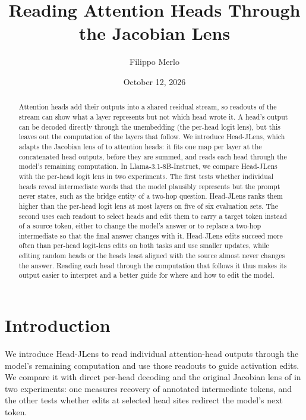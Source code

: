 \documentclass[11pt,a4paper]{article}
\title{Reading Attention Heads Through the Jacobian Lens}
\author{Filippo Merlo}
\date{October 12, 2026}
\begin{document}
\maketitle

\begin{abstract}
Attention heads add their outputs into a shared residual stream, so readouts of the stream can show what a layer represents but not which head wrote it. A head's output can be decoded directly through the unembedding (the per-head logit lens), but this leaves out the computation of the layers that follow. We introduce Head-JLens, which adapts the Jacobian lens of \citet{gurnee2026} to attention heads: it fits one map per layer at the concatenated head outputs, before they are summed, and reads each head through the model's remaining computation. In Llama-3.1-8B-Instruct, we compare Head-JLens with the per-head logit lens in two experiments. The first tests whether individual heads reveal intermediate words that the model plausibly represents but the prompt never states, such as the bridge entity of a two-hop question. Head-JLens ranks them higher than the per-head logit lens at most layers on five of six evaluation sets. The second uses each readout to select heads and edit them to carry a target token instead of a source token, either to change the model's answer or to replace a two-hop intermediate so that the final answer changes with it. Head-JLens edits succeed more often than per-head logit-lens edits on both tasks and use smaller updates, while editing random heads or the heads least aligned with the source almost never changes the answer. Reading each head through the computation that follows it thus makes its output easier to interpret and a better guide for where and how to edit the model.

\end{abstract}

\section{Introduction}\label{sec:1}

We introduce Head-JLens to read individual attention-head outputs through the model's remaining computation and use those readouts to guide activation edits. We compare it with direct per-head decoding and the original Jacobian lens of \citet{gurnee2026} in two experiments: one measures recovery of annotated intermediate tokens, and the other tests whether edits at selected head sites redirect the model's next token.
\end{document}
